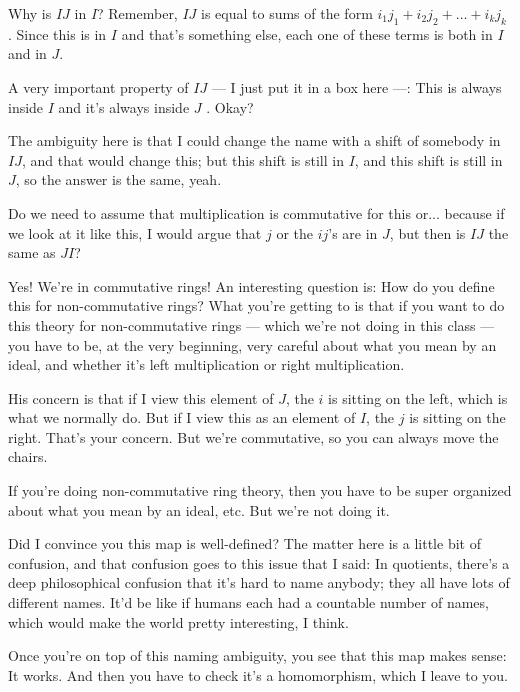 \begin{speech}[01:24:09 - 01:24:55]
Why is $IJ$ in $I$? Remember, $IJ$ is equal to sums of the form $i_1 j_1 + i_2 j_2 + \dots + i_k j_k$ . Since this is in $I$ and that's something else, each one of these terms is both in $I$ and in $J$.

A very important property of $IJ$ --- I just put it in a box here ---: This is always inside $I$ and it's always inside $J$ . Okay?

The ambiguity here is that I could change the name with a shift of somebody in $IJ$, and that would change this; but this shift is still in $I$, and this shift is still in $J$, so the answer is the same, yeah.
\end{speech}

\begin{student}
Do we need to assume that multiplication is commutative for this or... because if we look at it like this, I would argue that $j$ or the $ij$'s are in $J$, but then is $IJ$ the same as $JI$?
\end{student}

\begin{speech}[01:25:13 - 01:26:33]
Yes! We're in commutative rings! An interesting question is: How do you define this for non-commutative rings? What you're getting to is that if you want to do this theory for non-commutative rings --- which we're not doing in this class --- you have to be, at the very beginning, very careful about what you mean by an ideal, and whether it's left multiplication or right multiplication.

His concern is that if I view this element of $J$, the $i$ is sitting on the left, which is what we normally do. But if I view this as an element of $I$, the $j$ is sitting on the right. That's your concern. But we're commutative, so you can always move the chairs.

If you're doing non-commutative ring theory, then you have to be super organized about what you mean by an ideal, etc. But we're not doing it.

Did I convince you this map is well-defined? The matter here is a little bit of confusion, and that confusion goes to this issue that I said: In quotients, there's a deep philosophical confusion that it's hard to name anybody; they all have lots of different names. It'd be like if humans each had a countable number of names, which would make the world pretty interesting, I think.

Once you're on top of this naming ambiguity, you see that this map makes sense: It works. And then you have to check it's a homomorphism, which I leave to you.
\end{speech}

